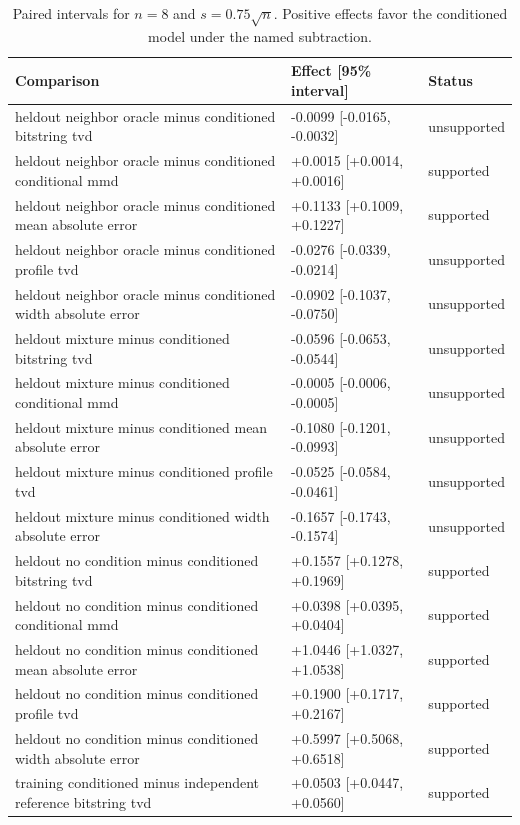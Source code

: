 \begin{table}[p]
\centering
\scriptsize
\setlength{\tabcolsep}{4pt}
\caption{Paired intervals for $n=8$ and $s=0.75\sqrt n$. Positive effects favor the conditioned model under the named subtraction.}
\label{tab:all-intervals-n8-w0.75}
\begin{tabular}{@{}p{}p{}p{}@{}}
\toprule
Comparison & Effect [95\% interval] & Status\\
\midrule
heldout neighbor oracle minus conditioned bitstring tvd & -0.0099 [-0.0165, -0.0032] & unsupported \\
heldout neighbor oracle minus conditioned conditional mmd & +0.0015 [+0.0014, +0.0016] & supported \\
heldout neighbor oracle minus conditioned mean absolute error & +0.1133 [+0.1009, +0.1227] & supported \\
heldout neighbor oracle minus conditioned profile tvd & -0.0276 [-0.0339, -0.0214] & unsupported \\
heldout neighbor oracle minus conditioned width absolute error & -0.0902 [-0.1037, -0.0750] & unsupported \\
heldout mixture minus conditioned bitstring tvd & -0.0596 [-0.0653, -0.0544] & unsupported \\
heldout mixture minus conditioned conditional mmd & -0.0005 [-0.0006, -0.0005] & unsupported \\
heldout mixture minus conditioned mean absolute error & -0.1080 [-0.1201, -0.0993] & unsupported \\
heldout mixture minus conditioned profile tvd & -0.0525 [-0.0584, -0.0461] & unsupported \\
heldout mixture minus conditioned width absolute error & -0.1657 [-0.1743, -0.1574] & unsupported \\
heldout no condition minus conditioned bitstring tvd & +0.1557 [+0.1278, +0.1969] & supported \\
heldout no condition minus conditioned conditional mmd & +0.0398 [+0.0395, +0.0404] & supported \\
heldout no condition minus conditioned mean absolute error & +1.0446 [+1.0327, +1.0538] & supported \\
heldout no condition minus conditioned profile tvd & +0.1900 [+0.1717, +0.2167] & supported \\
heldout no condition minus conditioned width absolute error & +0.5997 [+0.5068, +0.6518] & supported \\
training conditioned minus independent reference bitstring tvd & +0.0503 [+0.0447, +0.0560] & supported \\

\end{tabular}
\end{table}
